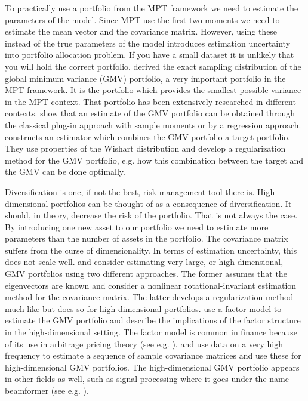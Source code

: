 To practically use a portfolio from the MPT framework we need to estimate the parameters of the model.
Since MPT use the first two moments we need to estimate the mean vector and the covariance matrix.
However, using these instead of the true parameters of the model introduces estimation uncertainty into portfolio allocation problem.
If you have a small dataset it is unlikely that you will hold the correct portfolio.
\citet{okhrin2006distributional} derived the exact sampling distribution of the global minimum variance (GMV) portfolio, a very important portfolio in the MPT framework.
It is the portfolio which provides the smallest possible variance in the MPT context.
That portfolio has been extensively researched in different contexts.
\citet{kempf2006estimating} show that an estimate of the GMV portfolio can be obtained through the classical plug-in approach with sample moments or by a regression approach.
\citet{frahm2010} constructs an estimator which combines the GMV portfolio a target portfolio. 
They use properties of the Wishart distribution and develop a regularization method for the GMV portfolio, e.g. how this combination between the target and the GMV can be done optimally.

Diversification is one, if not the best, risk management tool there is.
High-dimensional portfolios can be thought of as a consequence of diversification.
It should, in theory, decrease the risk of the portfolio. 
That is not always the case.
By introducing one new asset to our portfolio we need to estimate more parameters than the number of assets in the portfolio. 
The covariance matrix suffers from the curse of dimensionality. 
In terms of estimation uncertainty, this does not scale well.
\citet{lw17} and \citet{bodnar2018estimation} consider estimating very large, or high-dimensional, GMV portfolios using two different approaches.
The former assumes that the eigenvectors are known and consider a nonlinear rotational-invariant estimation method for the covariance matrix. 
The latter develops a regularization method much like \citet{frahm2010} but does so for high-dimensional portfolios.
\citet{ding2021high} use a factor model to estimate the GMV portfolio and describe the implications of the factor structure in the high-dimensional setting.
The factor model is common in finance because of its use in arbitrage pricing theory (see e.g. \citet{ross2013arbitrage}).
\citet{golosnoy2019exponential} and \citet{cai2020high} use data on a very high frequency to estimate a sequence of sample covariance matrices and use these for high-dimensional GMV portfolios. 
The high-dimensional GMV portfolio appears in other fields as well, such as signal processing where it goes under the name beamformer (see e.g. \citet{LiStoicaWang2004}). 

